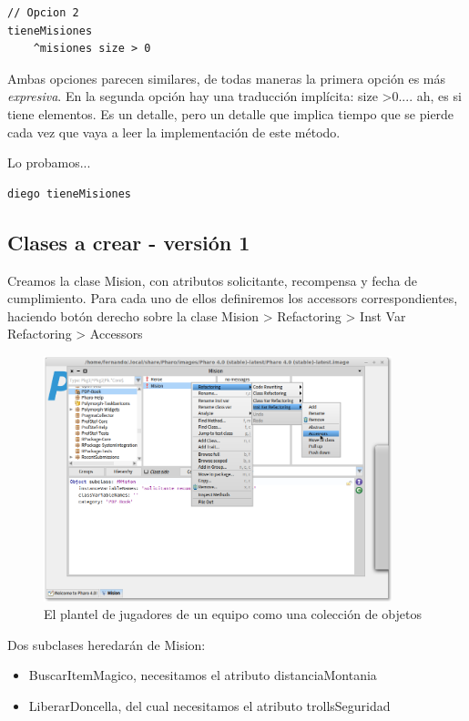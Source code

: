 \documentclass[a4paper,12pt]{book}
\begin{document}
    
\begin{lstlisting}[frame=single]
// Opcion 2
tieneMisiones
    ^misiones size > 0
\end{lstlisting}

Ambas opciones parecen similares, de todas maneras la primera opción es más \textit{expresiva}. En la segunda
opción hay una traducción implícita: size \textgreater  0.... ah, es si tiene elementos. Es un detalle, pero un detalle que
implica tiempo que se pierde cada vez que vaya a leer la implementación de este método.

Lo probamos...
\begin{lstlisting}[frame=single]
diego tieneMisiones
\end{lstlisting}

\subsection{Clases a crear - versión 1}
Creamos la clase Mision, con atributos solicitante, recompensa y fecha de cumplimiento. Para cada uno de ellos 
definiremos los accessors correspondientes, haciendo botón derecho sobre la clase Mision > Refactoring > 
Inst Var Refactoring > Accessors 
\begin{figure}[h!]
    \centering
    \includegraphics[width=0.9\textwidth]{images/10_accessors.png}
    \caption{El plantel de jugadores de un equipo como una colección de objetos}
\end{figure}
Dos subclases heredarán de Mision: 
\begin{itemize}
 \item BuscarItemMagico, necesitamos el atributo distanciaMontania
 \item LiberarDoncella, del cual necesitamos el atributo trollsSeguridad
\end{itemize}
\end{document}
